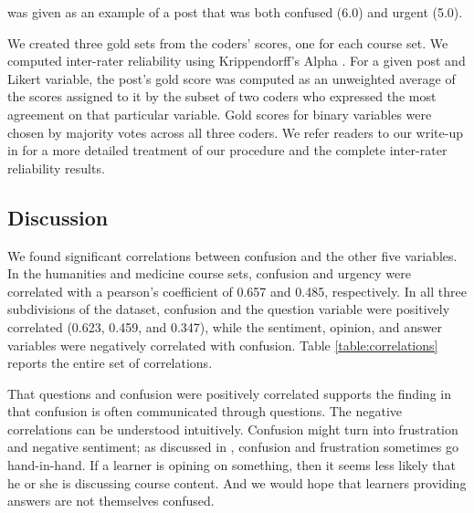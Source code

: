 \documentclass{edm_template}
\begin{document}
was given as an example of a post that was both confused (6.0) and urgent (5.0).

We created three gold sets from the coders' scores, one for each course set. We computed inter-rater reliability using Krippendorff's Alpha \cite{hayes2007answering}. For a given post and Likert variable, the post's gold score was computed as an unweighted average of the scores assigned to it by the subset of two coders who expressed the most agreement on that particular variable. Gold scores for binary variables were chosen by majority votes across all three coders. We refer readers to our write-up in \cite{stanfordMOOCPosts} for a more detailed treatment of our procedure and the complete inter-rater reliability results.


\subsection{Discussion}
We found significant correlations between confusion and the other five variables. In the humanities and medicine course sets, confusion and urgency were correlated with a pearson's coefficient of 0.657 and 0.485, respectively. In all three subdivisions of the dataset, confusion and the question variable were positively correlated (0.623, 0.459, and 0.347), while the sentiment, opinion, and answer variables were negatively correlated with confusion. Table \ref{table:correlations} reports the entire set of correlations.

That questions and confusion were positively correlated supports the finding in \cite{wilson1989learning} that confusion is often communicated through questions. The negative correlations can be understood intuitively. Confusion might turn into frustration and negative sentiment; as discussed in \cite{liu2013sequences}, confusion and frustration sometimes go hand-in-hand. If a learner is opining on something, then it seems less likely that he or she is discussing course content. And we would hope that learners providing answers are not themselves confused.
\end{document}
